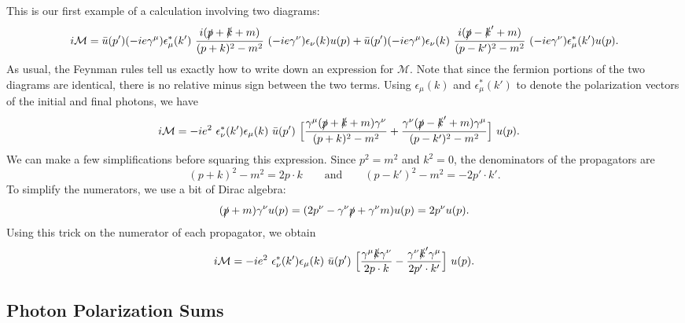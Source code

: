 This is our first example of a calculation involving two diagrams:
\begin{equation}
  i\mathcal{M} = \bar{u}(p')(-ie\gamma^\mu)\epsilon^{*}_{\mu}(k')\
    \frac{i(\slashed{p}+\slashed{k}+m)}{(p+k)^2-m^2}\
    (-ie\gamma^\nu)\epsilon_\nu(k)u(p)
    + \bar{u}(p')(-ie\gamma^\mu)\epsilon_\nu(k)\
      \frac{i(\slashed{p}-\slashed{k}'+m)}{(p-k')^2-m^2}\
      (-ie\gamma^\nu)\epsilon^{*}_\mu(k')u(p) .
\end{equation}
As usual, the Feynman rules tell us exactly how to write down an expression
for $\mathcal{M}$.  Note that since the fermion portions of the two diagrams
are identical, there is no relative minus sign between the two terms.  Using
$\epsilon_\mu(k)$ and $\epsilon^{*}_\mu(k')$ to denote the polarization vectors
of the initial and final photons, we have
\begin{equation}
  \begin{aligned}
    i\mathcal{M} &= -ie^2\ \epsilon^{*}_{\nu}(k')\epsilon_\mu(k)\
      \bar{u}(p')\ \Bigl[
        \frac{\gamma^\mu(\slashed{p}+\slashed{k}+m)\gamma^\nu}{(p+k)^2-m^2}
        + \frac{\gamma^\nu(\slashed{p}-\slashed{k}'+m)\gamma^\mu}
          {(p-k')^2-m^2} \Bigr]\ u(p) .
  \end{aligned}
  \label{eq:5.74}
\end{equation}
We can make a few simplifications before squaring this expression.  Since
$p^2 = m^2$ and $k^2 = 0$, the denominators of the propagators are
\begin{equation}
  (p+k)^2 - m^2 = 2p\cdot k
  \qquad\text{and}\qquad
  (p-k')^2 - m^2 = -2p'\cdot k' .
\end{equation}
To simplify the numerators, we use a bit of Dirac algebra:
\begin{equation}
  (\slashed{p}+m)\gamma^\nu u(p) = (2p^\nu - \gamma^\nu\slashed{p}
    + \gamma^\nu m)u(p) = 2p^\nu u(p) .
\end{equation}
Using this trick on the numerator of each propagator, we obtain
\begin{equation}
  i\mathcal{M} = -ie^2\ \epsilon^{*}_{\nu}(k')\epsilon_\mu(k)\
    \bar{u}(p')\ \Bigl[ \frac{\gamma^\mu\slashed{k}\gamma^\nu}{2p\cdot k}
      - \frac{\gamma^\nu\slashed{k}'\gamma^\mu}{2p'\cdot k'} \Bigr]\ u(p) .
  \label{eq:5.74b}
\end{equation}

\subsection{Photon Polarization Sums}

